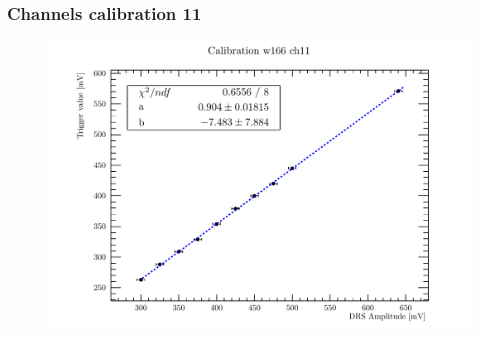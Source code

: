\begin{frame} [fragile]
\small
	\frametitle{Channels calibration 11}
    		\begin{figure}
		 \centering
			\includegraphics[scale=0.5]{figures/ch11.pdf}
		\end{figure}  
\end{frame}
